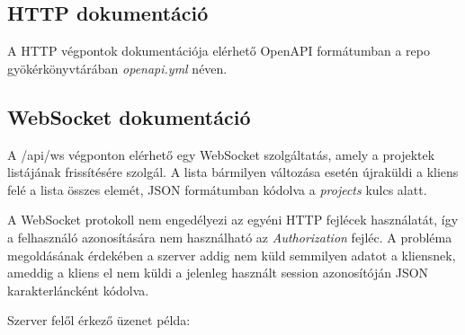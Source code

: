 \subsection{HTTP dokumentáció}
A HTTP végpontok dokumentációja elérhető OpenAPI formátumban a repo gyökérkönyvtárában \emph{openapi.yml} néven.

\subsection{WebSocket dokumentáció}
A /api/ws végponton elérhető egy WebSocket szolgáltatás, amely a projektek listájának frissítésére szolgál. A lista bármilyen változása esetén újraküldi a kliens felé a lista összes elemét, JSON formátumban kódolva a \emph{projects} kulcs alatt.

A WebSocket protokoll nem engedélyezi az egyéni HTTP fejlécek használatát, így a felhasználó azonosítására nem használható az \emph{Authorization} fejléc. A probléma megoldásának érdekében a szerver addig nem küld semmilyen adatot a kliensnek, ameddig a kliens el nem küldi a jelenleg használt session azonosítóján JSON karakterláncként kódolva.

Szerver felől érkező üzenet példa:
\begin{lstlisting}
      
\end{lstlisting}